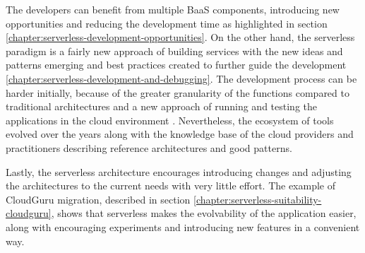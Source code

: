 The developers can benefit from multiple BaaS components, introducing new opportunities and reducing the development time as highlighted in section \ref{chapter:serverless-development-opportunities}. On the other hand, the serverless paradigm is a fairly new approach of building services with the new ideas and patterns emerging and best practices created to further guide the development \ref{chapter:serverless-development-and-debugging}.
The development process can be harder initially, because of the greater granularity of the functions compared to traditional architectures and a new approach of running and testing the applications in the cloud environment \cite{EvaluationOfServerlessApplicationProgrammingModel}. Nevertheless, the ecosystem of tools evolved over the years along with the knowledge base of the cloud providers and practitioners describing reference architectures and good patterns.

Lastly, the serverless architecture encourages introducing changes and adjusting the architectures to the current needs with very little effort. The example of CloudGuru migration, described in section \ref{chapter:serverless-suitability-cloudguru}, shows that serverless makes the evolvability of the application easier, along with encouraging experiments and introducing new features in a convenient way.




